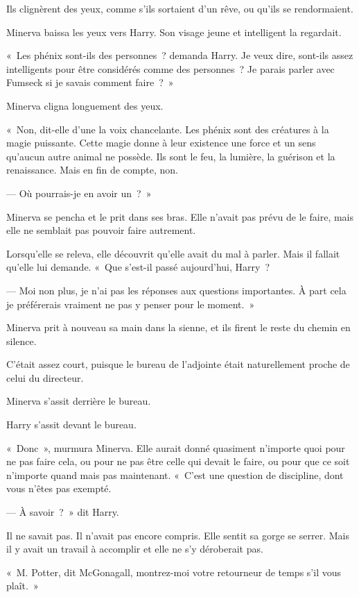 Ils clignèrent des yeux, comme s'ils sortaient d'un rêve, ou qu'ils se rendormaient.

Minerva baissa les yeux vers Harry.
Son visage jeune et intelligent la regardait.

«~Les phénix sont-ils des personnes~? demanda Harry.
Je veux dire, sont-ils assez intelligents pour être considérés comme des personnes~?
Je parais parler avec Fumseck si je savais comment faire~?~»

Minerva cligna longuement des yeux.

«~Non, dit-elle d'une la voix chancelante.
Les phénix sont des créatures à la magie puissante.
Cette magie donne à leur existence une force et un sens qu'aucun autre animal ne possède.
Ils sont le feu, la lumière, la guérison et la renaissance.
Mais en fin de compte, non.

--- Où pourrais-je en avoir un~?~»

Minerva se pencha et le prit dans ses bras.
Elle n'avait pas prévu de le faire, mais elle ne semblait pas pouvoir faire autrement.

Lorsqu'elle se releva, elle découvrit qu'elle avait du mal à parler.
Mais il fallait qu'elle lui demande.
«~Que s'est-il passé aujourd'hui, Harry~?

--- Moi non plus, je n'ai pas les réponses aux questions importantes.
À part cela je préférerais vraiment ne pas y penser pour le moment.~»

Minerva prit à nouveau sa main dans la sienne, et ils firent le reste du chemin en silence.

C'était assez court, puisque le bureau de l'adjointe était naturellement proche de celui du directeur.

Minerva s'assit derrière le bureau.

Harry s'assit devant le bureau.

«~Donc~», murmura Minerva.
Elle aurait donné quasiment n'importe quoi pour ne pas faire cela, ou pour ne pas être celle qui devait le faire, ou pour que ce soit n'importe quand mais pas maintenant.
«~C'est une question de discipline, dont vous n'êtes pas exempté.

--- À savoir~?~»
dit Harry.

Il ne savait pas.
Il n'avait pas encore compris.
Elle sentit sa gorge se serrer.
Mais il y avait un travail à accomplir et elle ne s'y déroberait pas.

«~M. Potter, dit McGonagall, montrez-moi votre retourneur de temps s'il vous plaît.~»

